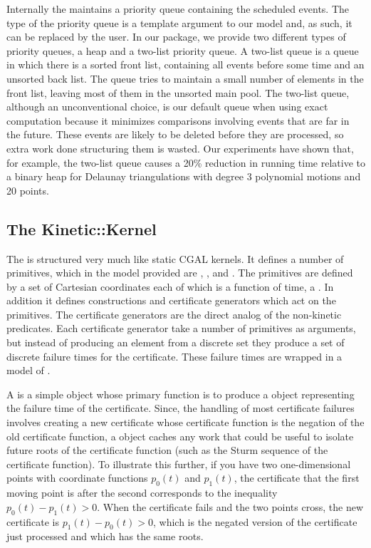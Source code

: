 Internally the  maintains a priority queue
containing the scheduled events. The type of the priority queue is a
template argument to our  model and, as such, it can
be replaced by the user.  In our package, we provide two different
types of priority queues, a heap and a two-list priority queue.  A
two-list queue is a queue in which there is a sorted front list,
containing all events before some time and an unsorted back list. The
queue tries to maintain a small number of elements in the front list,
leaving most of them in the unsorted main pool. The two-list queue,
although an unconventional choice, is our default queue when using
exact computation because it minimizes comparisons involving events
that are far in the future.  These events are likely to be deleted
before they are processed, so extra work done structuring them is
wasted.  Our experiments have shown that, for example, the two-list
queue causes a 20\% reduction in running time relative to a binary
heap for Delaunay triangulations with degree 3 polynomial motions and
20 points.



\subsection{The Kinetic::Kernel}

The  is structured very much like static CGAL
kernels. It defines a number of primitives, which in the model
provided are ,
,  and
. The primitives are defined by
a set of Cartesian coordinates each of which is a function of time, a
. In addition it defines constructions
and certificate generators which act on the primitives.  The
certificate generators are the direct analog of the non-kinetic
predicates. Each certificate generator take a number of primitives as
arguments, but instead of producing an element from a discrete set
they produce a set of discrete failure times for the certificate.
These failure times are wrapped in a model of .

A  is a simple object whose primary function is to
produce a  object representing the failure time of the
certificate.  Since, the handling of most certificate failures
involves creating a new certificate whose certificate function is the
negation of the old certificate function, a 
object caches any work that could be useful to isolate future roots of
the certificate function (such as the Sturm sequence of the
certificate function). To illustrate this further, if you have two
one-dimensional points with coordinate functions $p_0(t)$ and
$p_1(t)$, the certificate that the first moving point is after the
second corresponds to the inequality $p_0(t) - p_1(t) > 0$.  When the
certificate fails and the two points cross, the new certificate is
$p_1(t)- p_0(t) > 0$, which is the negated version of the certificate
just processed and which has the same roots.

